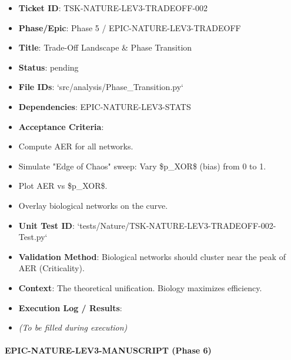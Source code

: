 \documentclass{article}
\begin{document}
\begin{itemize}
\item   \textbf{Ticket ID}: TSK-NATURE-LEV3-TRADEOFF-002
\item   \textbf{Phase/Epic}: Phase 5 / EPIC-NATURE-LEV3-TRADEOFF
\item   \textbf{Title}: Trade-Off Landscape \& Phase Transition
\item   \textbf{Status}: pending
\item   \textbf{File IDs}: `src/analysis/Phase\_Transition.py`
\item   \textbf{Dependencies}: EPIC-NATURE-LEV3-STATS
\item   \textbf{Acceptance Criteria}:
\item   Compute AER for all networks.
\item   Simulate "Edge of Chaos" sweep: Vary \$p\_{XOR}\$ (bias) from 0 to 1.
\item   Plot AER vs \$p\_{XOR}\$.
\item   Overlay biological networks on the curve.
\item   \textbf{Unit Test ID}: `tests/Nature/TSK-NATURE-LEV3-TRADEOFF-002-Test.py`
\item   \textbf{Validation Method}: Biological networks should cluster near the peak of AER (Criticality).
\item   \textbf{Context}: The theoretical unification. Biology maximizes efficiency.
\item   \textbf{Execution Log / Results}:
\item   \textit{(To be filled during execution)}
\end{itemize}

\paragraph{EPIC-NATURE-LEV3-MANUSCRIPT (Phase 6)}
\end{document}
